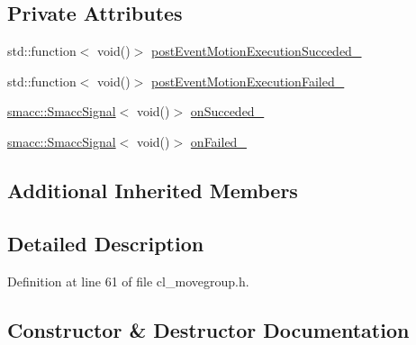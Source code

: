 \subsection*{Private Attributes}
\begin{DoxyCompactItemize}
\item 
std\+::function$<$ void()$>$ \hyperlink{classmove__group__interface__client_1_1ClMoveGroup_a76aa1b70c574348aa734f727fd5ef373}{post\+Event\+Motion\+Execution\+Succeded\+\_\+}
\item 
std\+::function$<$ void()$>$ \hyperlink{classmove__group__interface__client_1_1ClMoveGroup_a261f73d036417b5374d08a1e89325eed}{post\+Event\+Motion\+Execution\+Failed\+\_\+}
\item 
\hyperlink{classsmacc_1_1SmaccSignal}{smacc\+::\+Smacc\+Signal}$<$ void()$>$ \hyperlink{classmove__group__interface__client_1_1ClMoveGroup_ac82aa6c44468e8035ff5df6d74746b88}{on\+Succeded\+\_\+}
\item 
\hyperlink{classsmacc_1_1SmaccSignal}{smacc\+::\+Smacc\+Signal}$<$ void()$>$ \hyperlink{classmove__group__interface__client_1_1ClMoveGroup_a793ac2c50a1d897afe14a8780940e8ce}{on\+Failed\+\_\+}
\end{DoxyCompactItemize}
\subsection*{Additional Inherited Members}


\subsection{Detailed Description}


Definition at line 61 of file cl\+\_\+movegroup.\+h.



\subsection{Constructor \& Destructor Documentation}
\mbox{\label{classmove__group__interface__client_1_1ClMoveGroup_a31a1d99fa5f9876b3e222de8b3c194e8}} 
